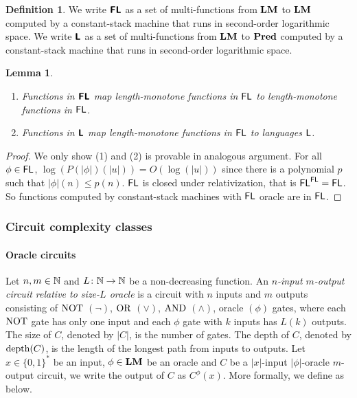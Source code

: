 \documentclass{article}
\newtheorem{lemma}[theorem]{Lemma}
\theoremstyle{definition}
\newtheorem{definition}[theorem]{Definition}
\theoremstyle{remark}
\begin{document}
\begin{definition}
 We write $\text{\bfseries \sffamily \upshape FL}$ as a set of multi-functions from $\mathbf{LM}$ to $\mathbf{LM}$
 computed by a constant-stack machine that runs in second-order logarithmic space.
 We write $\text{\bfseries \sffamily \upshape L}$ as a set of multi-functions from $\mathbf{LM}$ to $\mathbf{Pred}$
 computed by a constant-stack machine that runs in second-order logarithmic space.
\end{definition}

\begin{lemma}
\label{lemma:Ltwo-maps-L-to-L}
\mbox{}
\begin{enumerate}
 \item Functions in $\text{\bfseries \sffamily \upshape FL}$ map length-monotone functions in $\mathsf{FL}$
       to length-monotone functions in $\mathsf{FL}$.
 \item Functions in $\text{\bfseries \sffamily \upshape L}$ map length-monotone functions in $\mathsf{FL}$
       to languages $\mathsf{L}$.
\end{enumerate}
\end{lemma}

\begin{proof}
We only show (1) and (2) is provable in analogous argument.
For all $\phi \in \mathsf{FL}$, $\log(P(|\phi|)(|u|)) = O(\log(|u|))$
since there is a polynomial $p$ such that $|\phi|(n) \le p(n)$.
$\mathsf{FL}$ is closed under relativization, that is $\mathsf{FL}^{\mathsf{FL}} = \mathsf{FL}$.
So functions computed by constant-stack machines with $\mathsf{FL}$ oracle are in $\mathsf{FL}$.
\end{proof}


\subsubsection{Circuit complexity classes}
\paragraph{Oracle circuits}


Let $n, m \in \mathbb N$ and $L \colon \mathbb N \to \mathbb N$ be a non-decreasing function.
An \emph{$n$-input $m$-output circuit relative to size-$L$ oracle} is a circuit with
$n$ inputs and $m$ outputs consisting of 
$\mathrm{NOT}$ $(\neg)$, $\mathrm{OR}$ $(\vee)$, $\mathrm{AND}$ $(\wedge)$, oracle $(\phi)$ gates,
where each $\mathrm{NOT}$ gate has only one input and each $\phi$ gate with $k$ inputs
has $L(k)$ outputs.
The size of $C$, denoted by $|C|$, is the number of gates.
The depth of $C$, denoted by $\mathop{\rm depth}(C)$, is the length of the longest path
from inputs to outputs.
Let $x \in \{0, 1\}^*$ be an input, $\phi \in \mathbf{LM}$ be an oracle and
$C$ be a $|x|$-input $|\phi|$-oracle $m$-output circuit,
we write the output of $C$ as $C^\phi(x)$.
More formally, we define as below.
\end{document}
